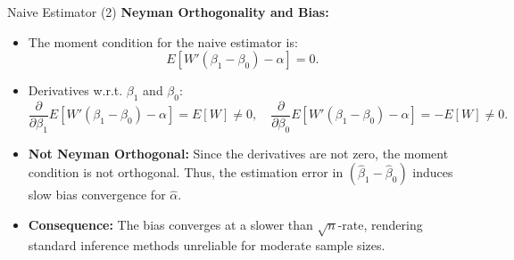 \documentclass[xcolor=svgnames,t]{beamer}
\begin{document}
                
                \begin{frame}{Naive Estimator (2)}
                \textbf{Neyman Orthogonality and Bias:}
                \begin{itemize}
                    \item The moment condition for the naive estimator is:
                    \[
                    E[W'(\beta_1 - \beta_0) - \alpha] = 0.
                    \]
                
                    \pause
                
                    \item Derivatives w.r.t. $\beta_1$ and $\beta_0$:
                    \[
                    \frac{\partial}{\partial \beta_1}E[W'(\beta_1 - \beta_0) - \alpha] = E[W] \neq 0, \quad
                    \frac{\partial}{\partial \beta_0}E[W'(\beta_1 - \beta_0) - \alpha] = -E[W] \neq 0.
                    \]
                
                    \pause
                
                    \item \textbf{Not Neyman Orthogonal:} Since the derivatives are not zero, the moment condition is not orthogonal. Thus, the estimation error in $(\widehat{\beta}_1 - \widehat{\beta}_0)$ induces slow bias convergence for $\widehat{\alpha}$.
                
                    \pause
                
                    \item \textbf{Consequence:} The bias converges at a slower than $\sqrt{n}$-rate, rendering standard inference methods unreliable for moderate sample sizes.
                \end{itemize}
                \end{frame}
                
                
            
\end{document}
